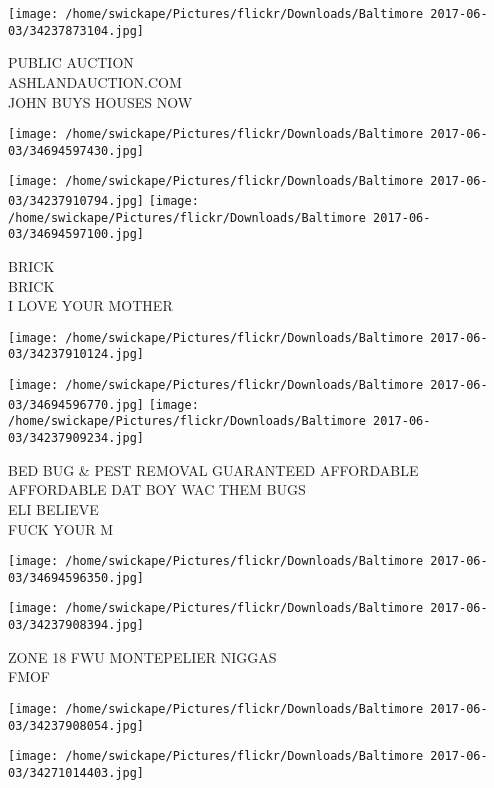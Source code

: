 \documentclass[10pt,letterpaper]{article}
\begin{document}
\texttt{[image: /home/swickape/Pictures/flickr/Downloads/Baltimore 2017-06-03/34237873104.jpg]}

PUBLIC AUCTION\\
ASHLANDAUCTION.COM\\
JOHN BUYS HOUSES NOW\\
\pagebreak

\texttt{[image: /home/swickape/Pictures/flickr/Downloads/Baltimore 2017-06-03/34694597430.jpg]}

\vspace{0.25in}
\texttt{[image: /home/swickape/Pictures/flickr/Downloads/Baltimore 2017-06-03/34237910794.jpg]}
\texttt{[image: /home/swickape/Pictures/flickr/Downloads/Baltimore 2017-06-03/34694597100.jpg]}

BRICK\\
BRICK\\
I LOVE YOUR MOTHER\\
\pagebreak

\texttt{[image: /home/swickape/Pictures/flickr/Downloads/Baltimore 2017-06-03/34237910124.jpg]}

\vspace{0.25in}
\texttt{[image: /home/swickape/Pictures/flickr/Downloads/Baltimore 2017-06-03/34694596770.jpg]}
\texttt{[image: /home/swickape/Pictures/flickr/Downloads/Baltimore 2017-06-03/34237909234.jpg]}

BED BUG \& PEST REMOVAL GUARANTEED AFFORDABLE AFFORDABLE DAT BOY WAC THEM BUGS\\
ELI BELIEVE\\
FUCK YOUR M\\
\pagebreak

\texttt{[image: /home/swickape/Pictures/flickr/Downloads/Baltimore 2017-06-03/34694596350.jpg]}

\vspace{0.25in}
\texttt{[image: /home/swickape/Pictures/flickr/Downloads/Baltimore 2017-06-03/34237908394.jpg]}

ZONE 18 FWU MONTEPELIER NIGGAS\\
FMOF\\
\pagebreak

\texttt{[image: /home/swickape/Pictures/flickr/Downloads/Baltimore 2017-06-03/34237908054.jpg]}

\vspace{0.25in}
\texttt{[image: /home/swickape/Pictures/flickr/Downloads/Baltimore 2017-06-03/34271014403.jpg]}
\end{document}
